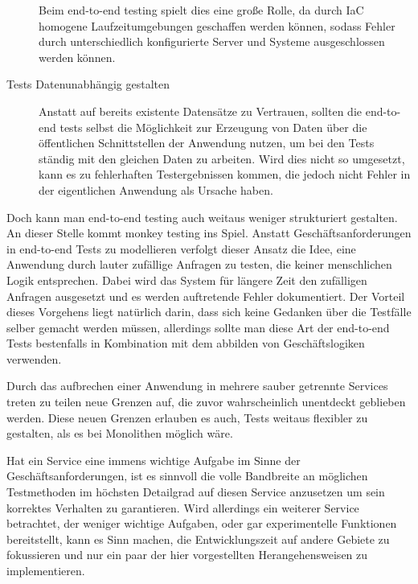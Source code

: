 \documentclass[12pt,a4paper,bibliography=totocnumbered,listof=totocnumbered]{scrartcl}
\begin{document}
\begin{description}
	Beim end-to-end testing spielt dies eine große Rolle, da durch \ac{IaC} homogene Laufzeitumgebungen geschaffen werden können, sodass Fehler durch unterschiedlich konfigurierte Server und Systeme ausgeschlossen werden können.\cite{clemson}
	
	\item[Tests Datenunabhängig gestalten] Anstatt auf bereits existente Datensätze zu Vertrauen, sollten die end-to-end tests selbst die Möglichkeit zur Erzeugung von Daten über die öffentlichen Schnittstellen der Anwendung nutzen, um bei den Tests ständig mit den gleichen Daten zu arbeiten. Wird dies nicht so umgesetzt, kann es zu fehlerhaften Testergebnissen kommen, die jedoch nicht Fehler in der eigentlichen Anwendung als Ursache haben.\cite{clemson}
\end{description}

Doch kann man end-to-end testing auch weitaus weniger strukturiert gestalten. An dieser Stelle kommt monkey testing ins Spiel. Anstatt Geschäftsanforderungen in end-to-end Tests zu modellieren verfolgt dieser Ansatz die Idee, eine Anwendung durch lauter zufällige Anfragen zu testen, die keiner menschlichen Logik entsprechen. Dabei wird das System für längere Zeit den zufälligen Anfragen ausgesetzt und es werden auftretende Fehler dokumentiert. Der Vorteil dieses Vorgehens liegt natürlich darin, dass sich keine Gedanken über die Testfälle selber gemacht werden müssen, allerdings sollte man diese Art der end-to-end Tests bestenfalls in Kombination mit dem abbilden von Geschäftslogiken verwenden.

Durch das aufbrechen einer Anwendung in mehrere sauber getrennte Services treten zu teilen neue Grenzen auf, die zuvor wahrscheinlich unentdeckt geblieben werden. Diese neuen Grenzen erlauben es auch, Tests weitaus flexibler zu gestalten, als es bei Monolithen möglich wäre.

Hat ein Service eine immens wichtige Aufgabe im Sinne der Geschäftsanforderungen, ist es sinnvoll die volle Bandbreite an möglichen Testmethoden im höchsten Detailgrad auf diesen Service anzusetzen um sein korrektes Verhalten zu garantieren. Wird allerdings ein weiterer Service betrachtet, der weniger wichtige Aufgaben, oder gar experimentelle Funktionen bereitstellt, kann es Sinn machen, die Entwicklungszeit auf andere Gebiete zu fokussieren und nur ein paar der hier vorgestellten Herangehensweisen zu implementieren.\cite{clemson}

\end{document}
